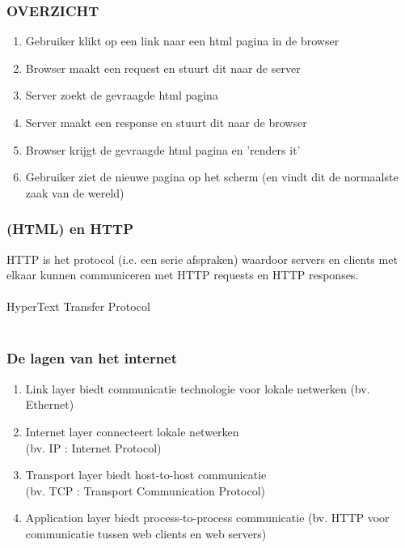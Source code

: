 \documentclass{beamer}
\begin{document}
\begin{frame}

\frametitle{OVERZICHT}

{\Large \begin{enumerate}
  \item Gebruiker klikt op een link naar een html pagina in de browser
  \item Browser maakt een request en stuurt dit naar de server
  \item Server zoekt de gevraagde html pagina
  \item Server maakt een response en stuurt dit naar de browser
  \item Browser krijgt de gevraagde html pagina en 'renders it'
  \item Gebruiker ziet de nieuwe pagina op het scherm (en vindt dit de normaalste zaak van de wereld)
\end{enumerate}}

\end{frame}


\begin{frame}

\frametitle{(HTML) en HTTP}

{\Large HTTP is het protocol (i.e. een serie afspraken) waardoor servers en clients met elkaar kunnen communiceren met HTTP requests
en HTTP responses.}\\~\\

{\huge HyperText Transfer Protocol}\\~\\

\end{frame}


\begin{frame}

\frametitle{De lagen van het internet}

{\Large \begin{enumerate}
  \item Link layer biedt communicatie technologie voor lokale netwerken (bv. Ethernet)
  \item Internet layer connecteert lokale netwerken \\(bv. IP : Internet Protocol)
  \item Transport layer biedt host-to-host communicatie \\(bv. TCP : Transport Communication Protocol)
  \item Application layer biedt process-to-process communicatie (bv. HTTP voor communicatie tussen web clients en web servers)
\end{enumerate}}

\end{frame}
\end{document}
